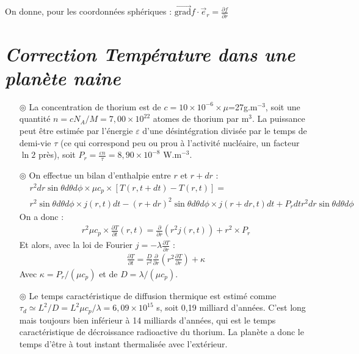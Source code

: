 \documentclass{report}
\begin{document}
On donne, pour les coordonnées sphériques : $\vec{\mathrm{grad}} f\cdot \vec{e}_r = \frac{\partial f}{\partial r}$

\newpage

\section*{\textit{Correction Température dans une planète naine}}

\begin{itemize}

	\item[$\circledcirc$] La concentration de thorium est de $c=10\times10^{-6}\times\mu$=27g.m$^{-3}$, soit une quantité $n=cN_A/M=7,00\times10^{22}$ atomes de thorium par m$^3$. La puissance peut être estimée par l'énergie $\varepsilon$ d'une désintégration divisée par le temps de demi-vie $\tau$ (ce qui correspond peu ou prou à l'activité nucléaire, un facteur $\ln2$ près), soit $P_r=\frac{\varepsilon n}{\tau}=8,90\times10^{-8}$ W.m$^{-3}$.
	
	\item[$\circledcirc$] On effectue un bilan d'enthalpie entre $r$ et $r+dr$ :
	\begin{align*}
		& r^2dr\sin\theta d\theta d\phi\times \mu c_p\times[T(r,t+dt)-T(r,t)]= \\
		& r^2\sin\theta d\theta d\phi\times j(r,t)dt-(r+dr)^2\sin\theta d\theta d\phi\times j(r+dr,t)dt + P_rdt r^2dr\sin\theta d\theta d\phi
	\end{align*}
	On a donc :
	\begin{align*}
		 r^2 \mu c_p\times\frac{\partial T}{\partial t}(r,t)= \frac{\partial}{\partial r} \left( r^2j(r,t)\right) + r^2\times P_r
	\end{align*}	
	Et alors, avec la loi de Fourier $j=-\lambda\frac{\partial T}{\partial r}$ :
	\begin{align*}
		\frac{\partial T}{\partial t}=\frac{D}{r^2}\frac{\partial }{\partial r}\left( r^2\frac{\partial T}{\partial r}\right)  + \kappa		
	\end{align*}
Avec $\kappa=P_r/(\mu c_p)$ et de $D=\lambda/(\mu c_p)$.

	\item[$\circledcirc$] Le temps caractéristique de diffusion thermique est estimé comme $\tau_d \simeq L^2/D=L^2\mu c_p/\lambda=6,09\times10^{15}$ s, soit 0,19 milliard d'années. C'est long mais toujours bien inférieur à 14 milliards d'années, qui est le temps caractéristique de décroissance radioactive du thorium. La planète a donc le temps d'être à tout instant thermalisée avec l'extérieur. 
	

\end{itemize}
\end{document}
